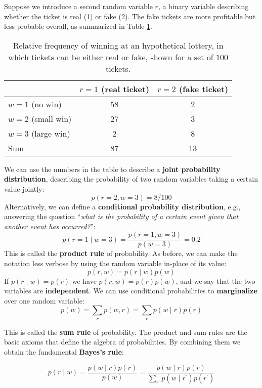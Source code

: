 Suppose we introduce a second random variable $r$, a binary variable describing whether the ticket is real (1) or fake (2). The fake tickets are more profitable but less probable overall, as summarized in Table \ref{tab:lottery_tickets}.
%
\begin{table}[h]
\centering
\caption{Relative frequency of winning at an hypothetical lottery, in which tickets can be either real or fake, shown for a set of $100$ tickets.}
\label{tab:lottery_tickets}
\begin{tabular}{@{}lcc@{}}
\toprule
 & $r=1$ (real ticket) & $r=2$ (fake ticket) \\ \midrule
$w=1$ (no win) & 58 & 2 \\
$w=2$ (small win) & 27 & 3 \\
$w=3$ (large win) & 2 & 8 \\ \midrule
Sum & 87 & 13 \\ \bottomrule
\end{tabular}
\end{table}

We can use the numbers in the table to describe a \textbf{joint probability distribution}, describing the probability of two random variables taking a certain value jointly:
%
$$
p(r=2,w=3)=8/100
$$
%
Alternatively, we can define a \textbf{conditional probability distribution}, e.g., answering the question “\textit{what is the probability of a certain event given that another event has occurred?}”:
%
$$
p(r=1 \mid w=3) = \frac{p(r=1, w=3)}{p(w=3)} = 0.2
$$
%
This is called the \textbf{product rule} of probability. As before, we can make the notation less verbose by using the random variable in-place of its value:
%
\begin{equation}
p(r,w)=p(r\mid w)p(w)
\label{eq:product_rule}
\end{equation}
%
If $p(r \mid w)=p(r)$ we have $p(r,w)=p(r)p(w)$, and we say that the two variables are \textbf{independent}. We can use conditional probabilities to \textbf{marginalize} over one random variable:
%
\begin{equation}
p(w)=\sum_{r} p(w,r) = \sum_r p(w \mid r)p(r)
\label{eq:sum_rule}
\end{equation}

This is called the \textbf{sum rule} of probability. The product and sum rules are the basic axioms that define the algebra of probabilities. By combining them we obtain the fundamental \textbf{Bayes’s rule}:

\begin{equation}
    p(r\mid w)=\frac{p(w \mid r)p(r)}{p(w)} =\frac{p(w \mid r)p(r)}{\sum_{r^\prime}p(w \mid r^\prime)p(r^\prime)}
    \label{eq:bayes_rule}
\end{equation}

